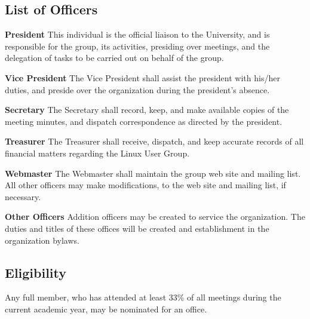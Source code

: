 \documentclass{article}
\begin{document}
\subsection{List of Officers}
\begin{description}
\item{\textbf{President}}
This individual is the official liaison to the University, and is responsible for the group, its activities, presiding over meetings, and the delegation of tasks to be carried out on behalf of the group.
\item{\textbf{Vice President}}
The Vice President shall assist the president with his/her duties, and preside over the organization during the president's absence.
\item{\textbf{Secretary}}
The Secretary shall record, keep, and make available copies of the meeting minutes, and dispatch correspondence as directed by the president.
\item{\textbf{Treasurer}}
The Treasurer shall receive, dispatch, and keep accurate records of all financial matters regarding the Linux User Group.
\item{\textbf{Webmaster}}
The Webmaster shall maintain the group web site and mailing list.  All other officers may make modifications, to the web site and mailing list, if necessary.
\item{\textbf{Other Officers}}
Addition officers may be created to service the organization. The duties and titles of these offices will be created and establishment in the organization bylaws.
\end{description}
\subsection{Eligibility}
Any full member, who has attended at least 33\% of all meetings during the current academic year, may be nominated for an office.
\end{document}
